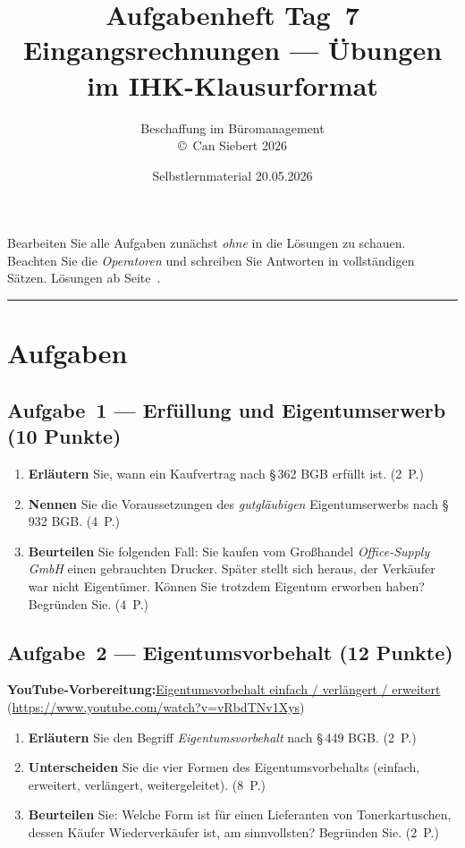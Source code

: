\documentclass[11pt, a4paper]{article}
\title{\vspace*{-1.5cm}\Huge\bfseries\color{bfwPrimaryDark}Aufgabenheft Tag~7\\[0.4em]
  \large\color{bfwInkSoft}\textnormal{Eingangsrechnungen --- Übungen im IHK-Klausurformat}}
\author{\textsf{Beschaffung im Büromanagement}\\
\textsf{\small\copyright\ Can Siebert\,\textperiodcentered\,2026}}
\date{Selbstlernmaterial \textperiodcentered{} 20.05.2026}
\begin{document}
\maketitle
\thispagestyle{empty}

\begin{merksatz}[title={\bfseries So nutzen Sie dieses Aufgabenheft}]
Bearbeiten Sie alle Aufgaben zunächst \emph{ohne} in die Lösungen zu schauen.
Beachten Sie die \emph{Operatoren} und schreiben Sie Antworten in vollständigen Sätzen.
Lösungen ab Seite~\pageref{loesungen}.
\end{merksatz}

\tableofcontents
\vspace{1em}
\hrule

\section{Aufgaben}

\subsection*{Aufgabe~1 --- Erfüllung und Eigentumserwerb (10 Punkte)}

\begin{enumerate}[label=(\alph*)]
  \item \textbf{Erläutern} Sie, wann ein Kaufvertrag nach §\,362 BGB erfüllt ist. \hfill (2~P.)
  \item \textbf{Nennen} Sie die Voraussetzungen des \emph{gutgläubigen} Eigentumserwerbs nach §\,932 BGB. \hfill (4~P.)
  \item \textbf{Beurteilen} Sie folgenden Fall: Sie kaufen vom Großhandel \emph{Office-Supply GmbH} einen gebrauchten Drucker. Später stellt sich heraus, der Verkäufer war nicht Eigentümer. Können Sie trotzdem Eigentum erworben haben? Begründen Sie. \hfill (4~P.)
\end{enumerate}

\subsection*{Aufgabe~2 --- Eigentumsvorbehalt (12 Punkte)}

\noindent\textbf{\color{bfwAccent}YouTube-Vorbereitung:}\enspace \href{https://www.youtube.com/watch?v=vRbdTNv1Xys}{Eigentumsvorbehalt einfach / verlängert / erweitert} (\url{https://www.youtube.com/watch?v=vRbdTNv1Xys})

\medskip
\begin{enumerate}[label=(\alph*)]
  \item \textbf{Erläutern} Sie den Begriff \emph{Eigentumsvorbehalt} nach §\,449 BGB. \hfill (2~P.)
  \item \textbf{Unterscheiden} Sie die vier Formen des Eigentumsvorbehalts (einfach, erweitert, verlängert, weitergeleitet). \hfill (8~P.)
  \item \textbf{Beurteilen} Sie: Welche Form ist für einen Lieferanten von Tonerkartuschen, dessen Käufer Wiederverkäufer ist, am sinnvollsten? Begründen Sie. \hfill (2~P.)
\end{enumerate}
\end{document}
